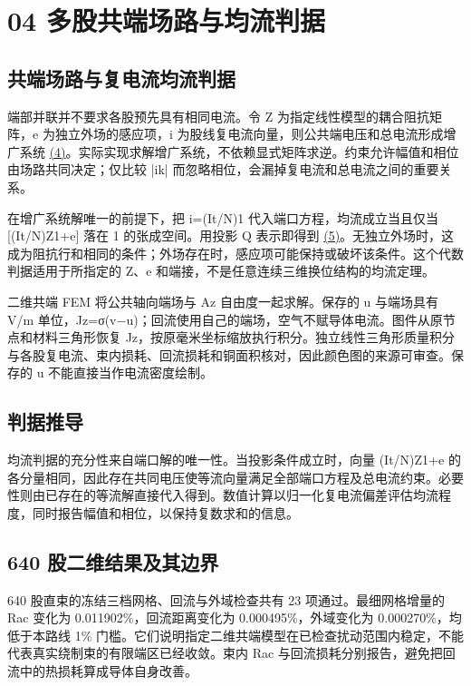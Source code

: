 \documentclass[journal,10pt]{IEEEtran}
\begin{document}
\section*{04 多股共端场路与均流判据}
\hypertarget{chapter-04}{}
\subsection*{共端场路与复电流均流判据}
\hypertarget{04.common.heading}{}
端部并联并不要求各股预先具有相同电流。令 Z 为指定线性模型的耦合阻抗矩阵，e 为独立外场的感应项，i 为股线复电流向量，则公共端电压和总电流形成增广系统 \href{report_zh-CN_ieee.pdf#E04}{(4)}。实际实现求解增广系统，不依赖显式矩阵求逆。约束允许幅值和相位由场路共同决定；仅比较 |ik| 而忽略相位，会漏掉复电流和总电流之间的重要关系。


在增广系统解唯一的前提下，把 i=(It/N)1 代入端口方程，均流成立当且仅当 [(It/N)Z1+e] 落在 1 的张成空间。用投影 Q 表示即得到 \href{report_zh-CN_ieee.pdf#E05}{(5)}。无独立外场时，这成为阻抗行和相同的条件；外场存在时，感应项可能保持或破坏该条件。这个代数判据适用于所指定的 Z、e 和端接，不是任意连续三维换位结构的均流定理。


二维共端 FEM 将公共轴向端场与 Az 自由度一起求解。保存的 u 与端场具有 V/m 单位，Jz=σ(v−u)；回流使用自己的端场，空气不赋导体电流。图件从原节点和材料三角形恢复 Jz，按原毫米坐标缩放执行积分。独立线性三角形质量积分与各股复电流、束内损耗、回流损耗和铜面积核对，因此颜色图的来源可审查。保存的 u 不能直接当作电流密度绘制。


\subsection*{判据推导}
\hypertarget{04.sharing_derivation.heading}{}
均流判据的充分性来自端口解的唯一性。当投影条件成立时，向量 (It/N)Z1+e 的各分量相同，因此存在共同电压使等流向量满足全部端口方程及总电流约束。必要性则由已存在的等流解直接代入得到。数值计算以归一化复电流偏差评估均流程度，同时报告幅值和相位，以保持复数求和的信息。


\subsection*{640 股二维结果及其边界}
\hypertarget{04.coax_results.heading}{}
640 股直束的冻结三档网格、回流与外域检查共有 23 项通过。最细网格增量的 Rac 变化为 0.011902\%，回流距离变化为 0.000495\%，外域变化为 0.000270\%，均低于本路线 1\% 门槛。它们说明指定二维共端模型在已检查扰动范围内稳定，不能代表真实绕制束的有限端区已经收敛。束内 Rac 与回流损耗分别报告，避免把回流中的热损耗算成导体自身改善。
\end{document}
